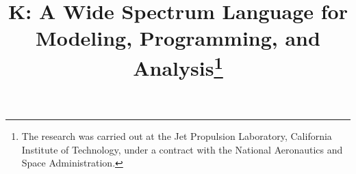 \documentclass[a4paper, twoside]{article}
\begin{document}
\title{K: A Wide Spectrum Language for\\ Modeling, Programming, and Analysis\thanks{ 
The research was carried out at the Jet Propulsion
Laboratory, California Institute of Technology, under a contract
with the National Aeronautics and Space
Administration. 
}}

\author{ 
   }



\onecolumn \maketitle \normalsize \vfill















{\small }


%
\end{document}
